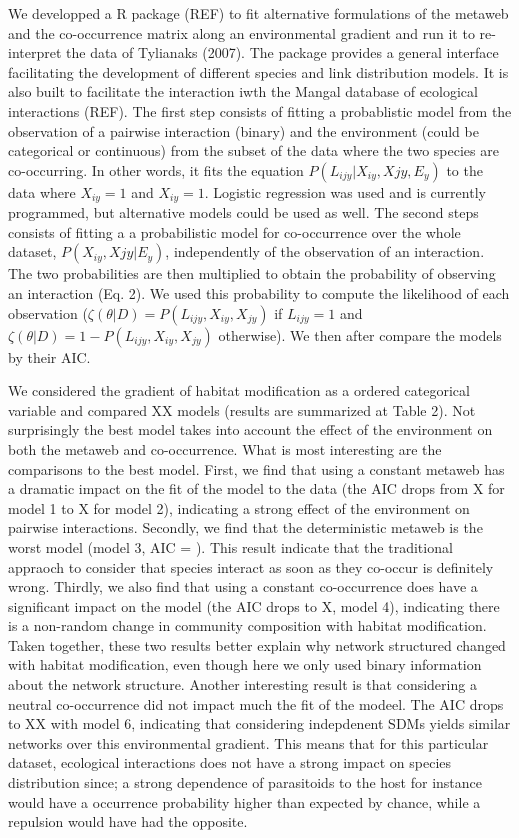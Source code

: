 \documentclass[12pt]{article}
\begin{document}
We developped a R package (REF) to fit alternative formulations of the metaweb
and the co-occurrence matrix along an environmental gradient and run it to
re-interpret the data of Tylianaks (2007). The package provides a general
interface facilitating the development of different species and link
distribution models. It is also built to facilitate the interaction iwth the
Mangal database of ecological interactions (REF). The first step consists of
fitting a probablistic model from the observation of a pairwise interaction
(binary) and the environment (could be categorical or continuous) from the
subset of the data where the two species are co-occurring. In other words, it
fits the equation $P(L_{ijy}|X_{iy},X{jy},E_y)$ to the data where $X_{iy} = 1$
and $X_{iy} = 1$. Logistic regression was used and is currently programmed, but
alternative models could be used as well. The second steps consists of fitting a
a probabilistic model for co-occurrence over the whole dataset,
$P(X_{iy},X{jy}|E_y)$, independently of the observation of an interaction. The
two probabilities are then multiplied to obtain the probability of observing an
interaction (Eq. 2). We used this probability to compute the likelihood of each
observation ($\zeta(\theta|D) = P(L_{ijy},X_{iy},X_{jy})$ if $L_{ijy}=1$ and
$\zeta(\theta|D) = 1 - P(L_{ijy},X_{iy},X_{jy})$ otherwise). We then after
compare the models by their AIC.

We considered the gradient of habitat modification as a ordered categorical
variable and compared XX models (results are summarized at Table 2). Not
surprisingly the best model takes into account the effect of the environment on
both the metaweb and co-occurrence. What is most interesting are the comparisons
to the best model. First, we find that using a constant metaweb has a dramatic
impact on the fit of the model to the data (the AIC drops from X for model 1 to
X for model 2), indicating a strong effect of the environment on pairwise
interactions. Secondly, we find that the deterministic metaweb is the worst
model (model 3, AIC = ). This result indicate that the traditional appraoch to
consider that species interact as soon as they co-occur is definitely wrong.
Thirdly, we also find that using a constant co-occurrence does have a
significant impact on the model (the AIC drops to X, model 4), indicating there
is a non-random change in community composition with habitat modification. Taken
together, these two results better explain why network structured changed with
habitat modification, even though here we only used binary information about the
network structure. Another interesting result is that considering a neutral
co-occurrence did not impact much the fit of the modeel. The AIC drops to XX
with model 6, indicating that considering indepdenent SDMs yields similar
networks over this environmental gradient. This means that for this particular
dataset, ecological interactions does not have a strong impact on species
distribution since; a strong dependence of parasitoids to the host for instance
would have a occurrence probability higher than expected by chance, while a
repulsion would have had the opposite.
\end{document}
